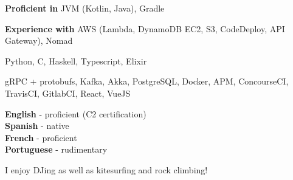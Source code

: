 \documentclass[9pt]{developercv}
\newcommand{\para}{\vspace{0.4em}}
\begin{document}
    \begin{minipage}[t]{0.53\textwidth}
        \vspace{-\baselineskip} %


        \vspace{-0.5em}
        \textbf{Proficient in} JVM (Kotlin, Java), Gradle

        \para
        \textbf{Experience with}
        AWS (Lambda, DynamoDB EC2, S3, CodeDeploy, API Gateway), Nomad

        \para

        Python, C, Haskell, Typescript, Elixir

        \para

        gRPC + protobufs, Kafka, Akka, PostgreSQL, Docker, APM, ConcourseCI, TravisCI, GitlabCI, React,
        VueJS

    \end{minipage}
    \hfill
    \begin{minipage}[t]{0.45\textwidth}
        \vspace{-\baselineskip} %


        \vspace{-0.5em}
        \textbf{English} - proficient (C2 certification)\\
        \textbf{Spanish} - native\\
        \textbf{French} - proficient\\
        \textbf{Portuguese} - rudimentary\\



        \vspace{-0.5em}
        I enjoy DJing as well as kitesurfing and rock climbing!

    \end{minipage}

\end{document}

